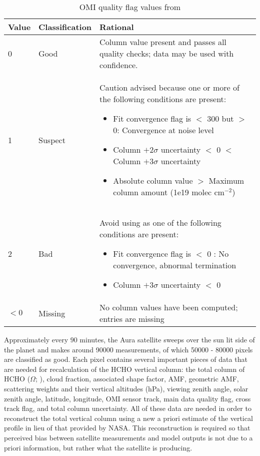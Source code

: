     \begin{table}
      \caption{OMI quality flag values from \textcite{Kurosu2014}}
      \begin{tabular}{  l  l  p{10cm} }
        \hline
        \textbf{Value} & \textbf{Classification} & \textbf{Rational} 
        \\ \hline
        0 & Good & Column value present and passes all quality checks; data may be used with confidence. 
        \\ \hline
        1 & Suspect & Caution advised because one or more of the following conditions are present: 
        \begin{itemize}
          \item Fit convergence flag is $<$ 300 but $>$ 0: Convergence at noise level
          \item Column $+ 2 \sigma$ uncertainty $<$ 0 $<$ Column $ + 3 \sigma $ uncertainty
          \item Absolute column value $>$ Maximum column amount (1e19 molec cm$^{-2}$)
        \end{itemize}
        \\ \hline
        2 & Bad & Avoid using as one of the following conditions are present: 
        \begin{itemize}
          \item Fit convergence flag is $<$ 0 : No convergence, abnormal termination
          \item Column $+ 3 \sigma$ uncertainty $<$ 0
        \end{itemize}
        \\ \hline
        $<0$ & Missing & No column values have been computed; entries are missing
        \\ \hline
      \end{tabular}
      \label{Model:datasets:OMHCHO:tab_qflag}
    \end{table}
    
    Approximately every $90$ minutes, the Aura satellite sweeps over the sun lit side of the planet and makes around 90000 measurements, of which 50000 - 80000 pixels are classified as good.
    Each pixel contains several important pieces of data that are needed for recalculation of the HCHO vertical column: the total column of HCHO ($\Omega$; \moleccm), cloud fraction, associated shape factor, AMF, geometric AMF, scattering weights and their vertical altitudes (hPa), viewing zenith angle, solar zenith angle, latitude, longitude, OMI sensor track, main data quality flag, cross track flag, and total column uncertainty.
    All of these data are needed in order to reconstruct the total vertical column using a new a priori estimate of the vertical profile in lieu of that provided by NASA.
    This reconstruction is required so that perceived bias between satellite measurements and model outputs is not due to a priori information, but rather what the satellite is producing.
    
